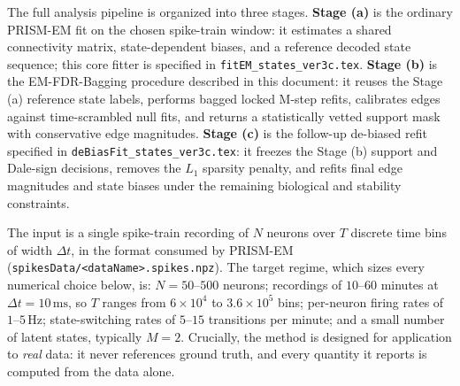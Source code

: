 \documentclass[11pt]{article}
\begin{document}
The full analysis pipeline is organized into three stages. \textbf{Stage (a)}
is the ordinary PRISM-EM fit on the chosen spike-train window: it estimates a
shared connectivity matrix, state-dependent biases, and a reference decoded
state sequence; this core fitter is specified in
\texttt{fitEM\_states\_ver3c.tex}. \textbf{Stage (b)} is the
EM-FDR-Bagging procedure described in this document: it reuses the Stage (a)
reference state labels, performs bagged locked M-step refits, calibrates
edges against time-scrambled null fits, and returns a statistically vetted
support mask with conservative edge magnitudes. \textbf{Stage (c)} is the
follow-up de-biased refit specified in
\texttt{deBiasFit\_states\_ver3c.tex}: it freezes the Stage (b) support and
Dale-sign decisions, removes the \(L_1\) sparsity penalty, and refits final
edge magnitudes and state biases under the remaining biological and
stability constraints.

The input is a single spike-train recording of \(N\) neurons over \(T\)
discrete time bins of width \(\Delta t\), in the format consumed by
PRISM-EM (\texttt{spikesData/<dataName>.spikes.npz}). The target regime,
which sizes every numerical choice below, is:
\(N=50\)–\(500\) neurons; recordings of \(10\)–\(60\) minutes at
\(\Delta t=10\,\text{ms}\), so \(T\) ranges from \(6\times10^{4}\) to
\(3.6\times10^{5}\) bins; per-neuron firing rates of \(1\)–\(5\,\text{Hz}\);
state-switching rates of \(5\)–\(15\) transitions per minute; and a small
number of latent states, typically \(M=2\). Crucially, the method is
designed for application to \emph{real} data: it never references ground
truth, and every quantity it reports is computed from the data alone.
\end{document}
